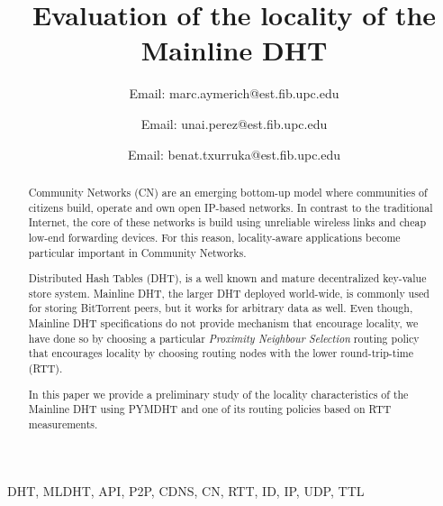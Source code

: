 \documentclass[conference]{IEEEtran}
\begin{document}
%
\title{Evaluation of the locality of the Mainline DHT}


\author{
Email: marc.aymerich@est.fib.upc.edu
\and
{}
Email: unai.perez@est.fib.upc.edu
\and
{}
Email: benat.txurruka@est.fib.upc.edu}


\maketitle


\begin{abstract}
Community Networks (CN) are an emerging bottom-up model where communities of citizens build, operate and own open IP-based networks. In contrast to the traditional Internet, the core of these networks is build using unreliable wireless links and cheap low-end forwarding devices. For this reason, locality-aware applications become particular important in Community Networks.

Distributed Hash Tables (DHT), is a well known and mature decentralized key-value store system. Mainline DHT, the larger DHT deployed world-wide, is commonly used for storing BitTorrent peers, but it works for arbitrary data as well. Even though, Mainline DHT specifications do not provide mechanism that encourage locality, we have done so by choosing a particular \textit{Proximity Neighbour Selection} routing policy that encourages locality by choosing routing nodes with the lower round-trip-time (RTT).

In this paper we provide a preliminary study of the locality characteristics of the Mainline DHT using PYMDHT and one of its routing policies based on RTT measurements.
\end{abstract}


\begin{IEEEkeywords}
DHT, MLDHT, API, P2P, CDNS, CN, RTT, ID, IP, UDP, TTL
\end{IEEEkeywords}

	
\end{document}
